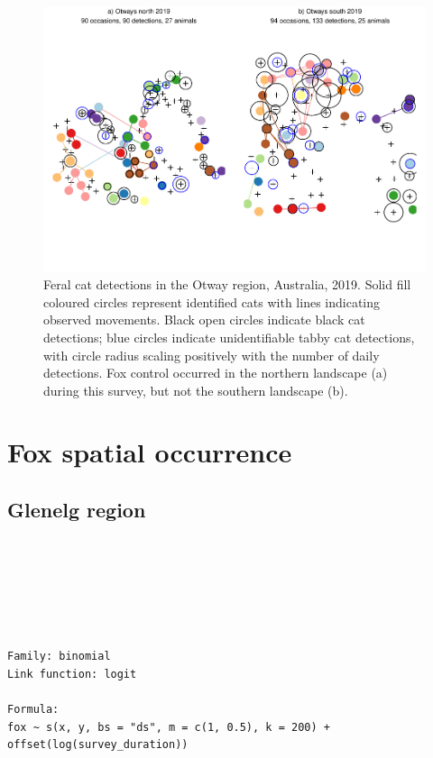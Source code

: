 \documentclass[11pt,a4paper,titlepage,twoside,openright]{style/unimelbthesis}
\begin{document}
\begin{mainmatter}
\begin{figure}
{\centering \includegraphics[width=1\linewidth]{figure/density-plot-ch-6-1} 

}

\caption{Feral cat detections in the Otway region, Australia, 2019. Solid fill coloured circles represent identified cats with lines indicating observed movements. Black open circles indicate black cat detections; blue circles indicate unidentifiable tabby cat detections, with circle radius scaling positively with the number of daily detections. Fox control occurred in the northern landscape (a) during this survey, but not the southern landscape (b).}\label{fig:density-plot-ch-6}
\end{figure}
\newpage

\hypertarget{density-app-fox}{%
\section{Fox spatial occurrence}\label{density-app-fox}}

\hypertarget{glenelg-region-4}{%
\subsection{Glenelg region}\label{glenelg-region-4}}

\(~\)

\(~\)

\(~\)
\begin{verbatim}

Family: binomial 
Link function: logit 

Formula:
fox ~ s(x, y, bs = "ds", m = c(1, 0.5), k = 200) + offset(log(survey_duration))


\end{verbatim}
\end{mainmatter}
\end{document}
